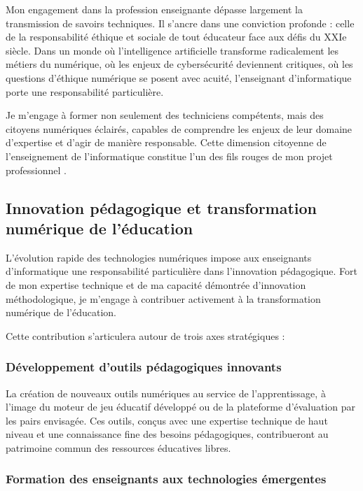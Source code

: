 \documentclass[12pt,a4paper]{report}
\begin{document}
Mon engagement dans la profession enseignante dépasse largement la transmission de savoirs techniques. Il s'ancre dans une conviction profonde : celle de la responsabilité éthique et sociale de tout éducateur face aux défis du XXIe siècle. Dans un monde où l'intelligence artificielle transforme radicalement les métiers du numérique, où les enjeux de cybersécurité deviennent critiques, où les questions d'éthique numérique se posent avec acuité, l'enseignant d'informatique porte une responsabilité particulière.

Je m'engage à former non seulement des techniciens compétents, mais des citoyens numériques éclairés, capables de comprendre les enjeux de leur domaine d'expertise et d'agir de manière responsable. Cette dimension citoyenne de l'enseignement de l'informatique constitue l'un des fils rouges de mon projet professionnel \parencite{competences_21_siecle}.

\subsection*{Innovation pédagogique et transformation numérique de l'éducation}

L'évolution rapide des technologies numériques impose aux enseignants d'informatique une responsabilité particulière dans l'innovation pédagogique. Fort de mon expertise technique et de ma capacité démontrée d'innovation méthodologique, je m'engage à contribuer activement à la transformation numérique de l'éducation.

Cette contribution s'articulera autour de trois axes stratégiques :

\subsubsection*{Développement d'outils pédagogiques innovants}

La création de nouveaux outils numériques au service de l'apprentissage, à l'image du moteur de jeu éducatif développé ou de la plateforme d'évaluation par les pairs envisagée. Ces outils, conçus avec une expertise technique de haut niveau et une connaissance fine des besoins pédagogiques, contribueront au patrimoine commun des ressources éducatives libres.

\subsubsection*{Formation des enseignants aux technologies émergentes}
\end{document}
